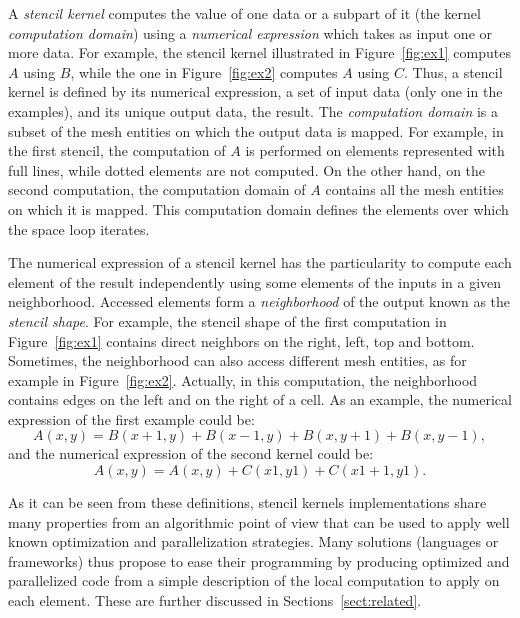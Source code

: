 A \emph{stencil kernel} computes the value of one data or a subpart of it (the kernel \emph{computation domain}) using a \emph{numerical expression} which takes as input one or more data.
For example, the stencil kernel illustrated in Figure~\ref{fig:ex1} computes $A$ using $B$, while the one in Figure~\ref{fig:ex2} computes $A$ using $C$. Thus, a stencil kernel is defined by its numerical expression, a set of input data (only one in the examples), and its unique output data, the result. 
The \emph{computation domain} is a subset of the mesh entities on which the output data is mapped. For example, in the first stencil, the computation of $A$ is performed on elements represented with full lines, while dotted elements are not computed. On the other hand, on the second computation, the computation domain of $A$ contains all the mesh entities on which it is mapped. This computation domain defines the elements over which the space loop iterates.

The numerical expression of a stencil kernel has the particularity to compute each element of the result independently using some elements of the inputs in a given neighborhood.
Accessed elements form a \emph{neighborhood} of the output known as the \emph{stencil shape}. For example, the stencil shape of the first computation in Figure~\ref{fig:ex1} contains direct neighbors on the right, left, top and bottom. Sometimes, the neighborhood can also access different mesh entities, as for example in Figure~\ref{fig:ex2}. Actually, in this computation, the neighborhood contains edges on the left and on the right of a cell. As an example, the numerical expression of the first example could be:
\begin{equation*} 
A(x,y) = B(x+1,y)+B(x-1,y)+B(x,y+1)+B(x,y-1),
\end{equation*}
and the numerical expression of the second kernel could be:
\begin{equation*} 
A(x,y) = A(x,y)+C(x1,y1)+C(x1+1,y1).
\end{equation*}

As it can be seen from these definitions, stencil kernels implementations share many properties from an algorithmic point of view that can be used to apply well known optimization and parallelization strategies.
Many solutions (languages or frameworks) thus propose to ease their programming by producing optimized and parallelized code from a simple description of the local computation to apply on each element.
These are further discussed in Sections~\ref{sect:related}.


